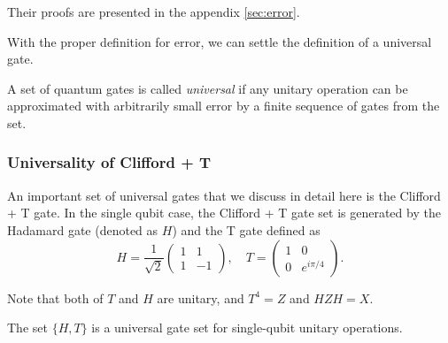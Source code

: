 Their proofs are presented in the appendix \ref{sec:error}.

With the proper definition for error, we can settle the definition of a universal gate.
\begin{definition}
A set of quantum gates is called \emph{universal} if any unitary operation can be approximated with arbitrarily small error by a finite sequence of gates from the set.
\end{definition}

\subsubsection{Universality of Clifford + T}

An important set of universal gates that we discuss in detail here is the Clifford + T gate. 
In the single qubit case, the Clifford + T gate set is generated by the Hadamard gate (denoted as $H$) and the T gate defined as
\begin{equation*}
		H = \frac{1}{\sqrt{2}} \begin{pmatrix}
		1 & 1\\
		1 & -1
		\end{pmatrix}, \quad T = \begin{pmatrix}
		1 & 0\\
		0 & e^{i\pi/4}
		\end{pmatrix}.
\end{equation*}

\begin{remark}
	Note that both of $T$ and $H$ are unitary, and $T^4 = Z$ and $HZH = X$.
\end{remark}

\begin{theorem}
	The set $\{H, T\}$ is a universal gate set for single-qubit unitary operations.
\end{theorem}

